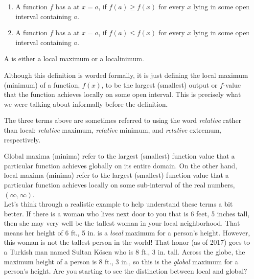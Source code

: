 \documentclass{ximera}
\begin{document}
\begin{definition}\hfil{}
\begin{enumerate}
\item A function $f$ has a  at $x=a$, if $f(a) \ge
  f(x)$ for every $x$ lying in some open interval containing $a$.
\item A function $f$ has a  at $x=a$, if $f(a) \le
  f(x)$ for every $x$ lying in some open interval containing $a$.
\end{enumerate}
A  is either a local
maximum or a localinimum.
\end{definition}

\begin{explanation}
Although this definition is worded formally, it is just defining the local maximum (minimum) of a function, $f(x)$, to be the largest (smallest) output or $f$-value that the function achieves locally on some open interval.  This is precisely what we were talking about informally before the definition.
\end{explanation}

\begin{warning}
The three terms above are sometimes referred to using the word \textit{relative} rather than local: \textit{relative} maximum, \textit{relative} minimum, and \textit{relative} extremum, respectively.
\end{warning}

\begin{example}
Global maxima (minima) refer to the largest (smallest) function value that a particular function achieves globally on its entire domain.  On the other hand, local maxima (minima) refer to the largest (smallest) function value that a particular function achieves locally on some sub-interval of the real numbers, $(\infty, \infty)$.  \\

Let's think through a realistic example to help understand these terms a bit better.  If there is a woman who lives next door to you that is 6 feet, 5 inches tall, then she may very well be the tallest woman in your local neighborhood.  That means her height of 6 ft., 5 in. is a \textit{local} maximum for a person's height.  However, this woman is not the tallest person in the world!  That honor (as of 2017) goes to a Turkish man named Sultan K{\"o}sen who is 8 ft., 3 in. tall.  Across the globe, the maximum height of a person is 8 ft., 3 in., so this is the \textit{global} maximum for a person's height.  Are you starting to see the distinction between local and global?  

\end{example}
\end{document}
